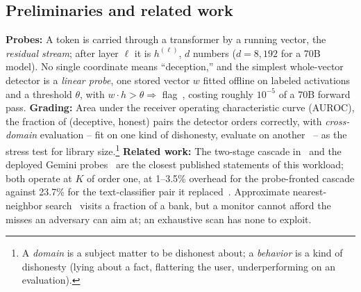 \documentclass[conference]{IEEEtran}
\newcommand{\auroc}{{AUROC}\xspace}
\begin{document}
\subsection{Preliminaries and related work}
\label{subsec:Probes}
\label{subsec:RelatedWork}
\textbf{Probes:} A token is carried through a transformer by a
running vector, the \emph{residual stream}; after layer $\ell$ it is
$h^{(\ell)}$, $d$ numbers ($d=8{,}192$ for a 70B model). No single
coordinate means ``deception,'' and the simplest whole-vector
detector is a \emph{linear probe}, one stored vector $w$ fitted offline on labeled activations
and a threshold $\theta$, with $w \cdot h > \theta \Rightarrow$
flag~\cite{marks2023geometry,burns2023ccs,zou2023repe}, costing
roughly $10^{-5}$ of a 70B forward pass.
\textbf{Grading:} Area under the receiver operating characteristic
curve (\auroc), the fraction of (deceptive, honest) pairs the
detector orders correctly, with
\emph{cross-domain} evaluation -- fit on one kind of dishonesty,
evaluate on another~\cite{ying2026spectrum} -- as the stress test for
library size.\footnote{A \emph{domain} is a subject matter to be
dishonest about; a \emph{behavior} is a kind of dishonesty (lying
about a fact, flattering the user, underperforming on an
evaluation).}
\textbf{Related work:} The two-stage cascade
in~\cite{ccpp2026,anthropic2026ccblog} and the deployed Gemini
probes~\cite{gemini2026probes} are the closest published statements
of this workload; both operate at $K$ of order one, at 1--3.5\%
overhead for the probe-fronted cascade against 23.7\% for the
text-classifier pair it replaced~\cite{cc2025,ccpp2026}. Approximate
nearest-neighbor search~\cite{charikar2002simhash,malkov2020hnsw}
visits a fraction of a bank, but a monitor cannot afford the misses
an adversary can aim at; an exhaustive scan has none to exploit.

\end{document}
